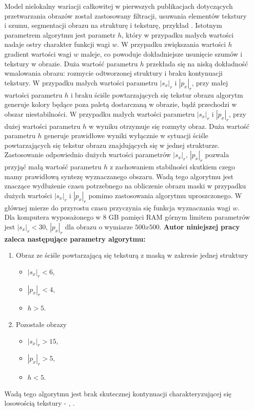 \documentclass[12pt, twoside, openany]{report}
\theoremstyle{definition}
\begin{document}
Model nielokalny wariacji całkowitej w pierwszych publikacjach dotyczących przetwarzania obrazów został zastosowany filtracji, usuwania elementów tekstury i szumu, segmentacji obrazu na strukturę i teksturę, przykład \cite{buades2005non}. Istotnym parametrem algorytmu jest parametr $h$, który w przypadku małych wartości nadaje ostry charakter funkcji wagi $w$. W przypadku zwiększania wartości $h$ gradient wartości wagi $w$ maleje, co powoduje dokładniejsze usunięcie szumów i tekstury w obrazie. Duża wartość parametru $h$ przekłada się na niską dokładność wmalowania obrazu: rozmycie odtworzonej struktury i braku kontynuacji tekstury. W przypadku małych wartości parametru $|s_x|_r$ i $|p_x|_r$, przy małej wartości parametru $h$ i braku ściśle powtarzających się tekstur obrazu algorytm generuje kolory będące poza paletą dostarczaną w obrazie, bądź przechodzi w obszar niestabilności. W przypadku małych wartości parametru  $|s_x|_r$ i $|p_x|_r$, przy dużej wartości parametru $h$ w wyniku otrzymuje się rozmyty obraz. Duża wartość parametru $h$ generuje prawidłowe wyniki wyłącznie w sytuacji ściśle powtarzających się tekstur obrazu znajdujących się w jednej strukturze. Zastosowanie odpowiednio dużych wartości parametrów $|s_x|_r$, $|p_x|_r$ pozwala przyjąć małą wartość parametru $h$ z zachowaniem stabilności skutkiem czego mamy prawidłową syntezę wyznaczanego obszaru. Wadą tego algorytmu jest znaczące wydłużenie czasu potrzebnego na obliczenie obrazu maski w przypadku dużych wartości $|s_x|_r$ i $|p_x|_r$ pomimo zastosowania algorytmu uproszczonego. W głównej mierze do przyrostu czasu przyczynia się funkcja wyznaczania wagi $w$. Dla komputera wyposażonego w 8 GB pamięci RAM górnym limitem parametrów jest $|s_x|_r <30$, $|p_x|_r$ dla obrazu o wymiarze $500x500$. \textbf{Autor niniejszej pracy zaleca następujące parametry algorytmu:}
\begin{enumerate}
\item Obraz ze ściśle powtarzającą się teksturą z maską w zakresie jednej struktury
\begin{itemize}
\item $|s_x|_r < 6$,
\item $|p_x|_r < 4$,
\item $h > 5$.
\end{itemize}
\item Pozostałe obrazy
\begin{itemize}
\item $|s_x|_r > 15$,
\item $|p_x|_r > 5$,
\item $h < 5$.
\end{itemize}
\end{enumerate}
Wadą tego algorytmu jest brak skutecznej kontynuacji charakteryzującej się losowością tekstury - \kotmyszm, \ObrIm .
\end{document}

